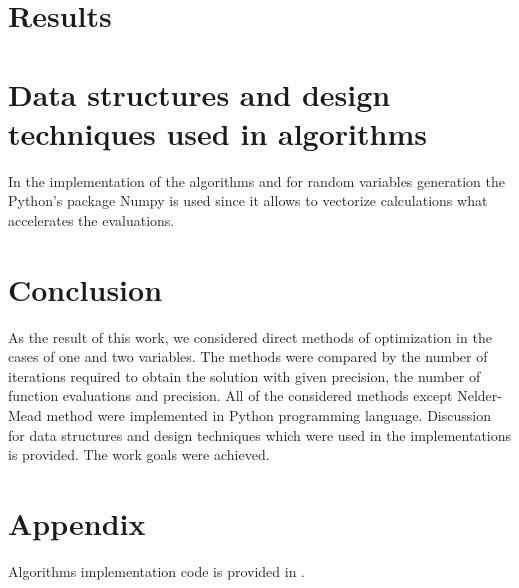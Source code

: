 \documentclass[12pt, bachelor, substylefile = algo_title.rtx]{disser}
\theoremstyle{definition}
\begin{document}
\section{Results}

\section{Data structures and design techniques used in algorithms}


In the implementation of the algorithms and for random variables generation the Python's package Numpy is used since it allows to vectorize calculations what accelerates the evaluations.


\section{Conclusion}
As the result of this work, we considered direct methods of optimization in the cases of one and two variables. The methods were compared by the number of iterations required to obtain the solution with given precision, the number of function evaluations and precision. All of the considered methods except Nelder-Mead method were implemented in Python programming language.
Discussion for data structures and design techniques which were used in the implementations is provided. The work goals were achieved.

\section{Appendix}
Algorithms implementation code is provided in \cite{repogithub}.

\nocite{Deisenroth2020}

{\small }

\end{document}
